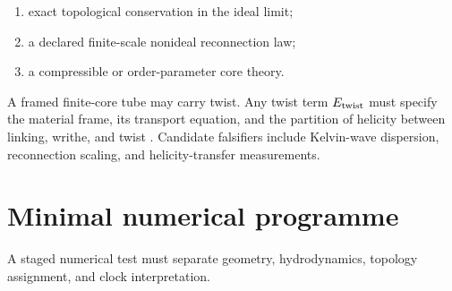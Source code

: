 \begin{enumerate}
\item exact topological conservation in the ideal limit;
\item a declared finite-scale nonideal reconnection law;
\item a compressible or order-parameter core theory.
\end{enumerate}

A framed finite-core tube may carry twist.  Any twist term
\(E_{\rm twist}\) must specify the material frame, its transport equation,
and the partition of helicity between linking, writhe, and twist
\cite{Moffatt1969}.  Candidate falsifiers include Kelvin-wave dispersion,
reconnection scaling, and helicity-transfer measurements.

\section{Minimal numerical programme}
\label{app:minimal-numerical-programme}

A staged numerical test must separate geometry, hydrodynamics, topology
assignment, and clock interpretation.

